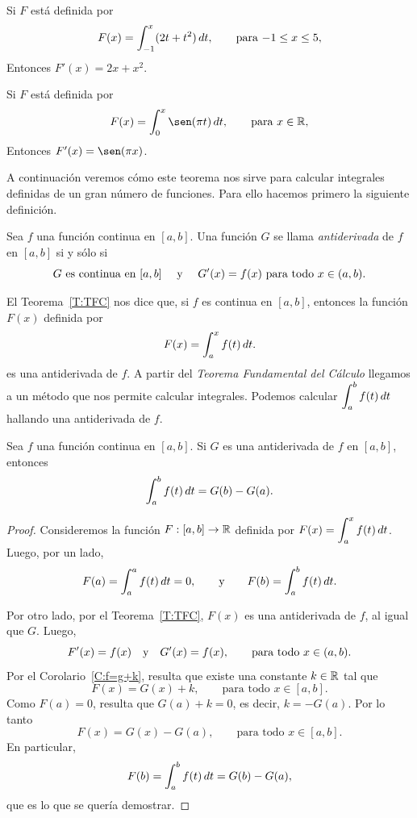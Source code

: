 \begin{example}
  Si $F$ está definida por 
  \[
  F(x)=\int_{-1}^x (2t+t^2) \,dt,
  \qquad \text{para $-1\le x\le 5$},
  \]
  Entonces $F'(x) = 2x+x^2$.
\end{example}


\begin{example}
  Si $F$ está definida por 
  \[
  F(x)=\int_{0}^x \sen(\pi t) \dt,
  \qquad \text{para $x\in\R$},
  \]
  Entonces $F'(x) = \sen(\pi x)$.
\end{example}

A continuación veremos cómo este teorema nos sirve para calcular integrales definidas de un gran número de funciones. Para ello hacemos primero la siguiente definición.

\begin{definition}[Antiderivada]
  Sea $f$ una función continua en $[a,b]$. Una función $G$ se llama \emph{antiderivada} de $f$ en $[a,b]$ si y sólo si
  \[
  G\text{ es continua en $[a,b]$ \quad y \quad}
  G'(x)=f(x) \text{ para todo $x\in(a,b)$.}\]
\end{definition}

El Teorema~\ref{T:TFC} nos dice que, si $f$ es continua en $[a,b]$, entonces la función $F(x)$ definida por 
\[
  F(x)=\int_a^x f(t)\,dt.
\]
es una antiderivada de $f$.
A partir del \emph{Teorema Fundamental del Cálculo} llegamos a un método que nos permite calcular integrales. Podemos calcular $\displaystyle\int_a^b f(t)\,dt$ hallando una antiderivada de $f$.

\begin{theorem}
   Sea $f$ una función continua en $[a,b]$. Si $G$ es una antiderivada de $f$ en $[a,b]$, entonces
   $$ \int_a^b f(t)\,dt = G(b)-G(a). $$
\end{theorem}

\begin{proof}
  Consideremos la función $F:[a,b]\to \mathbb{R}$ definida por $\displaystyle  F(x)=\int_a^x f(t)\,dt$. 
  Luego, por un lado, 
  $$F(a)=\int_a^a f(t)\,dt = 0,\qquad\text y\qquad  F(b)=\int_a^b f(t)\,dt.$$

  Por otro lado, por el Teorema~\ref{T:TFC},
  $F(x)$ es una antiderivada de $f$, al igual que $G$. Luego,
  \[
  F'(x)=f(x)\quad\text y\quad G'(x)=f(x),\qquad\text{para todo $x\in(a,b)$.}
  \]
  Por el Corolario~\ref{C:f=g+k}, resulta que existe una constante $k\in\mathbb{R}$ tal que 
  \[
  F(x) = G(x) + k,
  \qquad\text{para todo $x\in[a,b]$.}
  \]
  Como $F(a)=0$, resulta que $G(a)+k=0$, es decir, $k = -G(a)$.
  Por lo tanto
  \[
  F(x) = G(x) - G(a),
  \qquad\text{para todo $x\in[a,b]$.}
  \]
  En particular, 
  \[
  F(b) = \int_a^b f(t)\,dt = G(b)-G(a),
  \]
  que es lo que se quería demostrar.
\end{proof}

